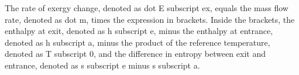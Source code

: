 The rate of exergy change, denoted as dot E subscript ex, equals the mass flow rate, denoted as dot m, times the expression in brackets. Inside the brackets, the enthalpy at exit, denoted as h subscript e, minus the enthalpy at entrance, denoted as h subscript a, minus the product of the reference temperature, denoted as T subscript 0, and the difference in entropy between exit and entrance, denoted as s subscript e minus s subscript a.